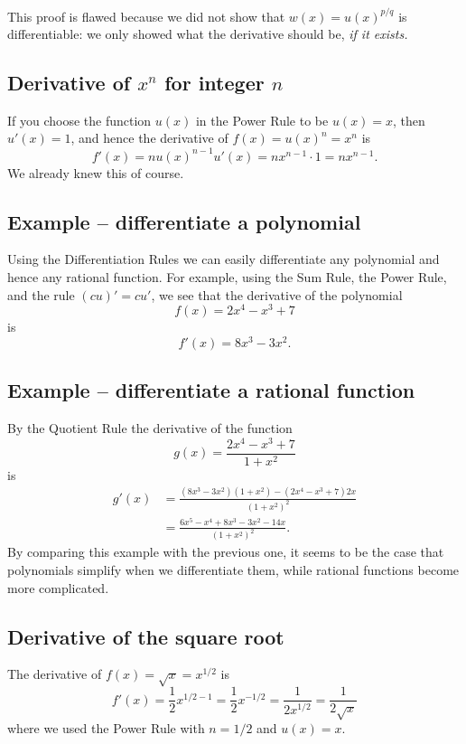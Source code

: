This proof is flawed because we did not show that $w(x) = u(x)^{p/q}$ is
differentiable:  we only showed what the derivative should be,
\textit{if it exists. }

\subsection{Derivative of $x^n$ for integer $n$} 
If you choose the function $u(x)$ in the Power Rule to be $u(x) = x$, then
$u'(x) = 1$, and hence the derivative of $f(x) = u(x)^n = x^n$ is
\[
f'(x)
= nu(x)^{n-1} u'(x)
= nx^{n-1}\cdot 1
= nx^{n-1}.
\]
We already knew this of course.

\subsection{Example -- differentiate a polynomial} 
Using the Differentiation Rules we can easily differentiate any polynomial and
hence any rational function.  For example, using the Sum Rule, the Power Rule,
and the rule $(cu)'=cu'$, we see that the derivative of the polynomial
\[
f(x)= 2x^4-x^3+7
\]
is
\[
f'(x)=8x^3-3x^2.
\]

\subsection{Example -- differentiate a rational function} 
By the Quotient Rule the derivative of the function
\[
g(x)=\frac{2x^4-x^3+7}{1+x^2}
\]
is
\begin{align*}
  g'(x)&=\frac{(8x^3-3x^2)(1+x^2)-(2x^4-x^3+7)2x}{(1+x^2)^2}\\
  &=\frac{6x^5-x^4+8x^3-3x^2-14x}{(1+x^2)^2}.
\end{align*}
By comparing this example with the previous one, it seems to be the case that
polynomials simplify when we differentiate them, while rational
functions become more complicated.

\subsection{Derivative of the square root} 
The derivative of $f(x)=\sqrt{x}=x^{1/2}$ is
\[
f'(x)
= \frac12 x^{1/2 -1}
= \frac12 x^{-1/2}
= \frac1{2x^{1/2}}=\frac1{2\sqrt x}
\]
where we used the Power Rule with $n=1/2$ and $u(x)=x$.

